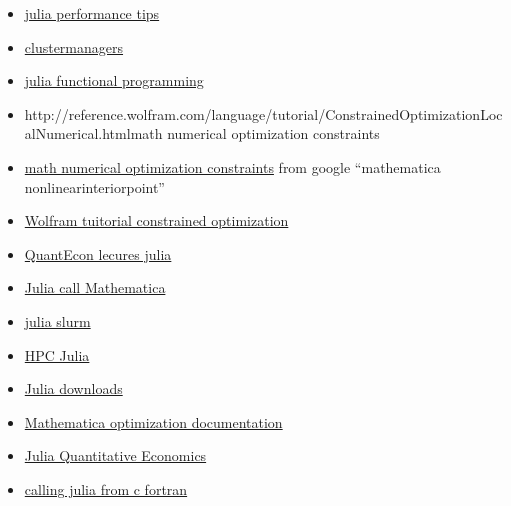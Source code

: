 \documentclass[hyperref]{labbook}
\begin{document}

\begin{itemize}
\item \href{https://docs.julialang.org/en/stable/manual/performance-tips/}{julia performance tips}
\item \href{https://github.com/JuliaParallel/ClusterManagers.jl}{clustermanagers}
\item \href{https://groups.google.com/forum/?fromgroups=#!topic/julia-dev/21AGMrqbuM0}{julia functional programming}
\end{itemize}



\begin{itemize}
\item {http://reference.wolfram.com/language/tutorial/ConstrainedOptimizationLocalNumerical.html}{math numerical optimization constraints}
\item \href{http://reference.wolfram.com/language/tutorial/ConstrainedOptimizationLocalNumerical.html}{math numerical optimization constraints} from google ``mathematica nonlinearinteriorpoint''
\item \href{http://www.johnboccio.com/MathematicaTutorials/08_ConstrainedOptimization.pdf}{Wolfram tuitorial constrained optimization}
\item \href{https://lectures.quantecon.org/jl/}{QuantEcon lecures julia}
\end{itemize}





\begin{itemize}
\item \href{https://github.com/JuliaInterop/Mathematica.jl}{Julia call Mathematica}
\item \href{https://github.com/JuliaParallel/ClusterManagers.jl}{julia slurm}
\item \href{http://ucidatascienceinitiative.github.io/IntroToJulia/Html/HPCJulia}{HPC Julia}
\item \href{http://ucidatascienceinitiative.github.io/IntroToJulia/Html/HPCJulia}{Julia downloads}
\item \href{http://reference.wolfram.com/language/tutorial/ConstrainedOptimizationGlobalNumerical.html}{Mathematica optimization documentation}
\item \href{https://lectures.quantecon.org/jl/getting_started.html}{Julia Quantitative Economics}
\item \href{https://docs.julialang.org/en/stable/manual/embedding/}{calling julia from c fortran}
\end{itemize}
\end{document}
